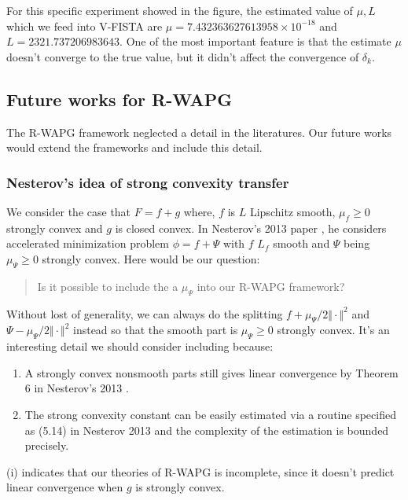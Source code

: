 \documentclass[12pt]{article}
\begin{document}
            For this specific experiment showed in the figure, the estimated value of $\mu, L$ which we feed into V-FISTA are $\mu = 7.432363627613958\times 10^{-18}$ and $L = 2321.737206983643$. 
            One of the most important feature is that the estimate $\mu$ doesn't converge to the true value, but it didn't affect the convergence of $\delta_k$. 

    
    \subsection{Future works for R-WAPG}
        The R-WAPG framework neglected a detail in the literatures. 
        Our future works would extend the frameworks and include this detail. 
        \subsubsection{Nesterov's idea of strong convexity transfer}
            We consider the case that $F = f + g$ where, $f$ is $L$ Lipschitz smooth, $\mu_f \ge 0$ strongly convex and $g$ is closed convex. 
            In Nesterov's 2013 paper \cite{nesterov_gradient_2013}, he considers accelerated  minimization problem $\phi = f + \Psi$ with $f$ $L_f$ smooth and $\Psi$ being $\mu_\Psi \ge 0$ strongly convex. 
            Here would be our question: 
            \begin{quote}
                Is it possible to include the a $\mu_\Psi$ into our R-WAPG framework? 
            \end{quote}
            \par
            Without lost of generality, we can always do the splitting $f + \mu_\Psi/2 \Vert \cdot\Vert^2$ and $\Psi - \mu_\Psi/2\Vert \cdot\Vert^2$ instead so that the smooth part is $\mu_\Psi \ge 0$ strongly convex. 
            It's an interesting detail we should consider including because: 
            \begin{enumerate}
                \item A strongly convex nonsmooth parts still gives linear convergence by Theorem 6 in Nesterov's 2013 \cite{nesterov_gradient_2013}. 
                \item The strong convexity constant can be easily estimated via a routine specified as (5.14) in Nesterov 2013 \cite{nesterov_gradient_2013} and the complexity of the estimation is bounded precisely. 
            \end{enumerate}
            (i) indicates that our theories of R-WAPG is incomplete, since it doesn't predict linear convergence when $g$ is strongly convex. 
\end{document}
